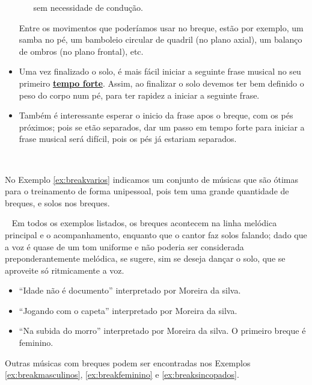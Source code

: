 \begin{itemize}
\begin{itemize}
sem necessidade de condução. 
\end{itemize}
Entre os movimentos que poderíamos usar no breque, estão por exemplo, 
um samba no pé, um bamboleio circular de quadril (no plano axial), um balanço de ombros (no plano frontal), etc. 
\item Uma vez finalizado o solo, é mais fácil iniciar a seguinte frase musical
no seu primeiro \hyperref[subsec:perceberTF1]{\textbf{tempo forte}}. 
Assim, 
ao finalizar o solo devemos ter bem definido o peso do corpo num pé,
para ter rapidez a iniciar a seguinte frase.
\item Também é interessante esperar o inicio da frase apos o breque, 
com os pés próximos; pois se etão separados, 
dar um passo em tempo forte para iniciar a frase musical será difícil,
pois os pés já estariam separados.
\end{itemize}~

No Exemplo \ref{ex:breakvarios} indicamos um conjunto de músicas 
que são ótimas para o treinamento de forma unipessoal,
pois tem uma grande quantidade de breques, 
e solos nos breques.
\begin{example}~
\label{ex:breakvarios}
Em todos os exemplos listados, os breques acontecem na linha melódica principal e o acompanhamento,
enquanto que o cantor faz solos falando; 
dado que a voz é quase de um tom uniforme e não poderia ser considerada preponderantemente melódica,
se sugere, sim se deseja dançar o solo, que se aproveite só ritmicamente a voz.
\begin{itemize}
\item ``Idade não é documento'' interpretado por Moreira da silva.
\item ``Jogando com o capeta'' interpretado por Moreira da silva.
\item ``Na subida do morro'' interpretado por Moreira da silva. 
O primeiro breque é feminino.
\end{itemize}
\end{example}

Outras músicas com breques podem ser encontradas nos Exemplos \ref{ex:breakmasculinos},
\ref{ex:breakfeminino} e 
\ref{ex:breaksincopados}.
